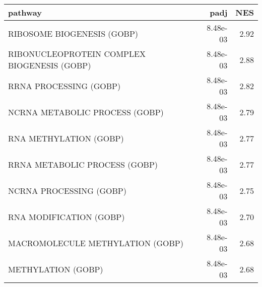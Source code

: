 \begin{tabular}{lrr}
\toprule
                                     pathway &      padj &   NES \\
\midrule
                  RIBOSOME BIOGENESIS (GOBP) &  8.48e-03 &  2.92 \\
 RIBONUCLEOPROTEIN COMPLEX BIOGENESIS (GOBP) &  8.48e-03 &  2.88 \\
                      RRNA PROCESSING (GOBP) &  8.48e-03 &  2.82 \\
              NCRNA METABOLIC PROCESS (GOBP) &  8.48e-03 &  2.79 \\
                      RNA METHYLATION (GOBP) &  8.48e-03 &  2.77 \\
               RRNA METABOLIC PROCESS (GOBP) &  8.48e-03 &  2.77 \\
                     NCRNA PROCESSING (GOBP) &  8.48e-03 &  2.75 \\
                     RNA MODIFICATION (GOBP) &  8.48e-03 &  2.70 \\
            MACROMOLECULE METHYLATION (GOBP) &  8.48e-03 &  2.68 \\
                          METHYLATION (GOBP) &  8.48e-03 &  2.68 \\
\bottomrule
\end{tabular}
